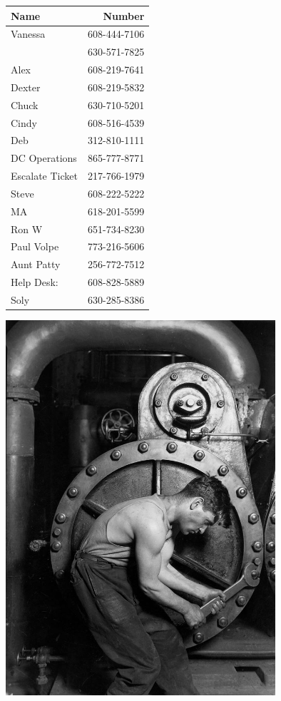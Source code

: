 \documentclass[12pt,twoside]{article}
\begin{document}
\begin{center}
\begin{tabular}{lr}
\hline
\textbf{Name} & \textbf{Number}\\
\hline
Vanessa & 608-444-7106\\
& 630-571-7825\\
Alex & 608-219-7641\\
Dexter & 608-219-5832\\
Chuck & 630-710-5201\\
Cindy & 608-516-4539\\
Deb & 312-810-1111\\
DC Operations & 865-777-8771\\
Escalate Ticket & 217-766-1979\\
Steve & 608-222-5222\\
MA & 618-201-5599\\
Ron W & 651-734-8230\\
Paul Volpe & 773-216-5606\\
Aunt Patty & 256-772-7512\\
Help Desk: & 608-828-5889\\
Soly & 630-285-8386\\
\hline
\end{tabular}
\end{center}

\includegraphics[width=10cm]{Pictures/7-1.jpg}
\end{document}

